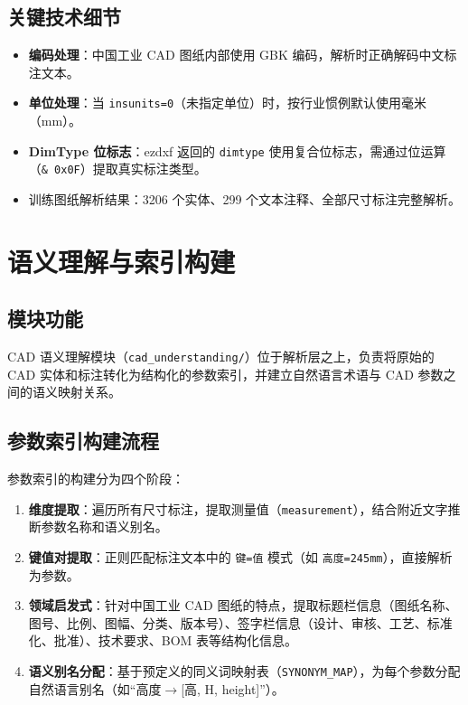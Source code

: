 \documentclass[11pt,a4paper]{article}
\begin{document}
\subsection{关键技术细节}

\begin{itemize}[nosep]
  \item \textbf{编码处理}：中国工业 CAD 图纸内部使用 GBK 编码，解析时正确解码中文标注文本。
  \item \textbf{单位处理}：当 \texttt{insunits=0}（未指定单位）时，按行业惯例默认使用毫米（mm）。
  \item \textbf{DimType 位标志}：ezdxf 返回的 \texttt{dimtype} 使用复合位标志，需通过位运算（\texttt{\& 0x0F}）提取真实标注类型。
  \item 训练图纸解析结果：3206 个实体、299 个文本注释、全部尺寸标注完整解析。
\end{itemize}

\section{语义理解与索引构建}

\subsection{模块功能}

CAD 语义理解模块（\texttt{cad\_understanding/}）位于解析层之上，负责将原始的 CAD 实体和标注转化为结构化的参数索引，并建立自然语言术语与 CAD 参数之间的语义映射关系。

\subsection{参数索引构建流程}

参数索引的构建分为四个阶段：

\begin{enumerate}[nosep]
  \item \textbf{维度提取}：遍历所有尺寸标注，提取测量值（\texttt{measurement}），结合附近文字推断参数名称和语义别名。
  \item \textbf{键值对提取}：正则匹配标注文本中的 \texttt{键=值} 模式（如 \texttt{高度=245mm}），直接解析为参数。
  \item \textbf{领域启发式}：针对中国工业 CAD 图纸的特点，提取标题栏信息（图纸名称、图号、比例、图幅、分类、版本号）、签字栏信息（设计、审核、工艺、标准化、批准）、技术要求、BOM 表等结构化信息。
  \item \textbf{语义别名分配}：基于预定义的同义词映射表（\texttt{SYNONYM\_MAP}），为每个参数分配自然语言别名（如“高度$\rightarrow$[高, H, height]”）。
\end{enumerate}
\end{document}
